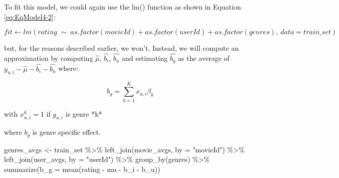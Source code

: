 \documentclass[
]{article}
\newenvironment{Shaded}{}{}
\newcommand{\AttributeTok}[1]{\textcolor[rgb]{0.49,0.56,0.16}{#1}}
\newcommand{\FunctionTok}[1]{\textcolor[rgb]{0.02,0.16,0.49}{#1}}
\newcommand{\NormalTok}[1]{#1}
\newcommand{\OtherTok}[1]{\textcolor[rgb]{0.00,0.44,0.13}{#1}}
\newcommand{\SpecialCharTok}[1]{\textcolor[rgb]{0.25,0.44,0.63}{#1}}
\newcommand{\StringTok}[1]{\textcolor[rgb]{0.25,0.44,0.63}{#1}}
\begin{document}
To fit this model, we could again use the lm() function as shown in
Equation \ref{eq:EqModel4-2}:

%
\par

\label{eq:EqModel4-2} \begin{equation}
  fit \leftarrow lm(rating \; \sim \; as.factor(movieId) + as.factor(userId) + as.factor(genres), \: data = train\_{}set)
\end{equation}

but, for the reasons described earlier, we won't. Instead, we will
compute an approximation by computing \(\hat{\mu}\), \(\hat{b_{i}}\),
\(\hat{b_{u}}\) and estimating \(\hat{b_{g}}\) as the average of
\(y_{u,i}-\hat{\mu}-\hat{b_{i}}-\hat{b_{u}}\) where:\\

%
\par

\label{eq:EqModel4-3} \begin{equation}
  b_{g} = \sum_{k=1}^Kx_{u,i}\beta_k
\end{equation}

\begin{center}
with $x_{u,i}^k=1$ if $g_{u,i}$ is genre *k*
\end{center}

where \(b_{g}\) is genre specific effect.

\begin{Shaded}
\begin{Highlighting}[]
\NormalTok{genres\_avgs }\OtherTok{\textless{}{-}}\NormalTok{ train\_set }\SpecialCharTok{\%\textgreater{}\%} \FunctionTok{left\_join}\NormalTok{(movie\_avgs, }\AttributeTok{by =} \StringTok{"movieId"}\NormalTok{) }\SpecialCharTok{\%\textgreater{}\%} 
    \FunctionTok{left\_join}\NormalTok{(user\_avgs, }\AttributeTok{by =} \StringTok{"userId"}\NormalTok{) }\SpecialCharTok{\%\textgreater{}\%} \FunctionTok{group\_by}\NormalTok{(genres) }\SpecialCharTok{\%\textgreater{}\%} 
    \FunctionTok{summarize}\NormalTok{(}\AttributeTok{b\_g =} \FunctionTok{mean}\NormalTok{(rating }\SpecialCharTok{{-}}\NormalTok{ mu }\SpecialCharTok{{-}}\NormalTok{ b\_i }\SpecialCharTok{{-}}\NormalTok{ b\_u))}
\end{Highlighting}
\end{Shaded}
\end{document}
